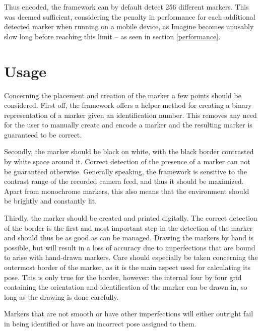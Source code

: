 Thus encoded, the framework can by default detect 256 different markers.
This was deemed sufficient, considering the penalty in performance for each additional detected marker when running on a mobile device, as Imagine becomes unusably slow long before reaching this limit – as seen in section \ref{performance}.

\section{Usage}

Concerning the placement and creation of the marker a few points should be considered.
First off, the framework offers a helper method for creating a binary representation of a marker given an identification number.
This removes any need for the user to manually create and encode a marker and the resulting marker is guaranteed to be correct.

Secondly, the marker should be black on white, with the black border contrasted by white space around it.
Correct detection of the presence of a marker can not be guaranteed otherwise.
Generally speaking, the framework is sensitive to the contrast range of the recorded camera feed, and thus it should be maximized.
Apart from monochrome markers, this also means that the environment should be brightly and constantly lit.

Thirdly, the marker should be created and printed digitally.
The correct detection of the border is the first and most important step in the detection of the marker and should thus be as good as can be managed.
Drawing the markers by hand is possible, but will result in a loss of accuracy due to imperfections that are bound to arise with hand-drawn markers.
Care should especially be taken concerning the outermost border of the marker, as it is the main aspect used for calculating its pose.
This is only true for the border, however: the internal four by four grid containing the orientation and identification of the marker can be drawn in, so long as the drawing is done carefully.

Markers that are not smooth or have other imperfections will either outright fail in being identified or have an incorrect pose assigned to them.
